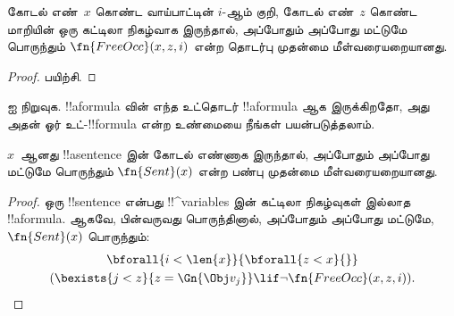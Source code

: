 \documentclass[../../../include/open-logic-section]{subfiles}
\begin{document}
\begin{prop}
கோடல் எண்~$x$ கொண்ட வாய்பாட்டின் $i$-ஆம் குறி, கோடல் எண்~$z$ கொண்ட
மாறியின் ஒரு கட்டிலா நிகழ்வாக இருந்தால், அப்போதும் அப்போது மட்டுமே பொருந்தும்
$\fn{FreeOcc}(x, z, i)$ என்ற தொடர்பு முதன்மை மீள்வரையறையானது.
\end{prop}

\begin{proof}
பயிற்சி.
\end{proof}

\begin{prob}
 ஐ நிறுவுக. !!a{formula} வின்
எந்த உட்தொடர் !!a{formula} ஆக இருக்கிறதோ, அது அதன் ஓர் உட்-!!{formula}
என்ற உண்மையை நீங்கள் பயன்படுத்தலாம்.
\end{prob}

\begin{prop}
$x$~ஆனது !!a{sentence} இன் கோடல் எண்ணாக இருந்தால், அப்போதும் அப்போது
மட்டுமே பொருந்தும் $\fn{Sent}(x)$ என்ற பண்பு முதன்மை மீள்வரையறையானது.
\end{prop}

\begin{proof}
ஒரு !!{sentence} என்பது !!^{variable}s இன் கட்டிலா நிகழ்வுகள் இல்லாத
!!a{formula}. ஆகவே, பின்வருவது பொருந்தினால், அப்போதும் அப்போது மட்டுமே,
$\fn{Sent}(x)$ பொருந்தும்:
\begin{multline*}
\bforall{i<\len{x}}{\bforall{z<x}{}}\\
(\bexists{j<z}{z=\Gn{\Obj v_j}} \lif \lnot\fn{FreeOcc}(x,z,i)).
\end{multline*}
\end{proof}
\end{document}
